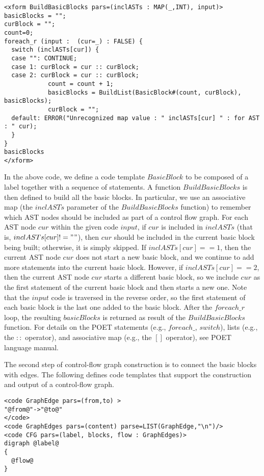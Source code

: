 \documentclass[11pt]{article}
\begin{document}
\begin {verbatim}
<xform BuildBasicBlocks pars=(inclASTs : MAP(_,INT), input)>
basicBlocks = "";
curBlock = "";
count=0;
foreach_r (input :  (cur=_) : FALSE) {
  switch (inclASTs[cur]) {
  case "": CONTINUE;
  case 1: curBlock = cur :: curBlock;
  case 2: curBlock = cur :: curBlock;
            count = count + 1;
            basicBlocks = BuildList(BasicBlock#(count, curBlock), basicBlocks);
            curBlock = "";
  default: ERROR("Unrecognized map value : " inclASTs[cur] " : for AST : " cur);
  }
}
basicBlocks
</xform>
\end {verbatim}
In the above code, we define a code template $BasicBlock$ to be composed of a label together
with a sequence of statements.  A function $BuildBasicBlocks$ is then defined to build all the
basic blocks.
In particular, we use an associative map (the $inclASTs$ parameter of the $BuildBasicBlocks$ function)
to remember which AST nodes should be included as part of a control flow graph.  
For each AST node $cur$ within the given code $input$, if $cur$ is included in $inclASTs$
(that is, $inclASTs[cur] != ""$), then $cur$ should be included in the current basic block being built;
otherwise, it is simply skipped.
If $inclASTs[cur] == 1$, then the current AST node $cur$ does not start a new basic block,
and we continue to add more statements into the current basic block. However, if
$inclASTs[cur] == 2$, then the current AST node $cur$ starts a different basic block, so we include
$cur$ as the first statement of the current basic block and then starts a new one.
Note that the $input$ code is traversed in the reverse order, so the first statement of each basic
block is the last one added to the basic block. After the $foreach\_r$ loop, the resulting
$basicBlocks$ is returned as result of the $BuildBasicBlocks$ function.
For details on the POET statements (e.g., $foreach\_$,
$switch$), lists (e.g., the $::$ operator), and  associative map (e.g., the $[]$ operator), see POET
language manual.

The second step of control-flow graph construction is to connect the basic blocks with edges.
The following defines code templates that support the construction and output of a control-flow
graph.
\begin {verbatim}
<code GraphEdge pars=(from,to) >
"@from@"->"@to@"
</code>
<code GraphEdges pars=(content) parse=LIST(GraphEdge,"\n")/>
<code CFG pars=(label, blocks, flow : GraphEdges)>
digraph @label@
{
  @flow@
}


\end{verbatim}
\end{document}
